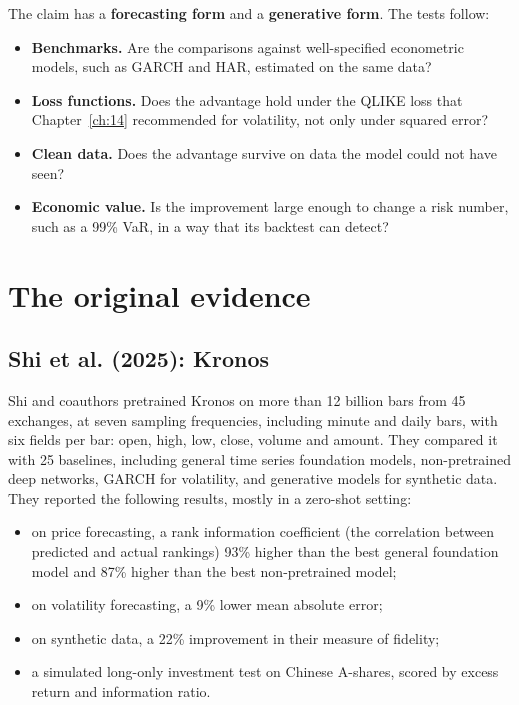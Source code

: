 The claim has a \textbf{forecasting form} and a \textbf{generative form}. The tests follow:

\begin{itemize}
  \item \textbf{Benchmarks.} Are the comparisons against well-specified econometric models, such as GARCH and HAR, estimated on the same data?
  \item \textbf{Loss functions.} Does the advantage hold under the QLIKE loss that Chapter~\ref{ch:14} recommended for volatility, not only under squared error?
  \item \textbf{Clean data.} Does the advantage survive on data the model could not have seen?
  \item \textbf{Economic value.} Is the improvement large enough to change a risk number, such as a 99\% VaR, in a way that its backtest can detect?
\end{itemize}

\section{The original evidence}
\label{sec:22-evidence}

\subsection{Shi et al. (2025): Kronos}

Shi and coauthors pretrained Kronos on more than 12 billion bars from 45 exchanges, at seven sampling frequencies, including minute and daily bars, with six fields per bar: open, high, low, close, volume and amount. They compared it with 25 baselines, including general time series foundation models, non-pretrained deep networks, GARCH for volatility, and generative models for synthetic data. They reported the following results, mostly in a zero-shot setting:

\begin{itemize}
  \item on price forecasting, a rank information coefficient (the correlation between predicted and actual rankings) 93\% higher than the best general foundation model and 87\% higher than the best non-pretrained model;
  \item on volatility forecasting, a 9\% lower mean absolute error;
  \item on synthetic data, a 22\% improvement in their measure of fidelity;
  \item a simulated long-only investment test on Chinese A-shares, scored by excess return and information ratio.
\end{itemize}

